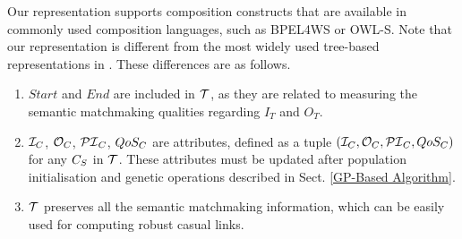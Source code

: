 Our representation supports composition constructs that are available in commonly used composition languages, such as BPEL4WS or OWL-S. Note that our representation is different from the most widely used tree-based representations in \cite{gupta2015optimization,da2016genetic,yu2013adaptive}. These differences are as follows.
\begin{enumerate}
\item $Start$ and $End$ are included in $\mathcal{T}$, as they are related to measuring the semantic matchmaking qualities regarding $I_T$ and $O_T$.
\item $\mathcal{I}_C$, $\mathcal{O}_C$, $\mathcal{PI}_C$, $QoS_C$ are attributes, defined as a tuple $(\mathcal{I}_C, \mathcal{O}_C, \mathcal{PI}_C, QoS_C )$ for  any  $C_S$ in $\mathcal{T}$. These attributes must be updated after population initialisation and genetic operations described in Sect. \ref{GP-Based Algorithm}.
\item $\mathcal{T}$ preserves all the semantic matchmaking information, which can be easily used for computing robust casual links.
\end{enumerate}



